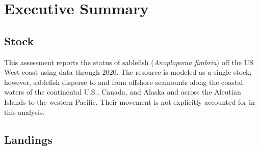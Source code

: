 \documentclass[11pt,
  english,
  a4paper,
]{article}
\begin{document}
\newcommand{\lt}{\ensuremath <}
\newcommand{\gt}{\ensuremath >}

\newlength{\cslhangindent}
\setlength{\cslhangindent}{1.5em}
\newenvironment{cslreferences}%
  {\setlength{\parindent}{0pt}%
  \everypar{\setlength{\hangindent}{\cslhangindent}}\ignorespaces}%
  {\par}

\pagebreak
{}
\setcounter{page}{1}

\renewcommand{\thetable}{\roman{table}}
\renewcommand{\thefigure}{\roman{figure}}


\hypertarget{executive-summary}{%
\section*{Executive Summary}\label{executive-summary}}

\leavevmode\tagmcend\tagstructend


\hypertarget{stock}{%
\subsection*{Stock}\label{stock}}

\leavevmode\tagmcend\tagstructend


This assessment reports the status of sablefish (\emph{Anoplopoma fimbria}) off the US West coast using data through 2020. The resource is modeled as a single stock; however, sablefish disperse to and from offshore seamounts along the coastal waters of the continental U.S., Canada, and Alaska and across the Aleutian Islands to the western Pacific. Their movement is not explicitly accounted for in this analysis.

\leavevmode\tagmcend\tagstructend\par


\hypertarget{landings}{%
\subsection*{Landings}\label{landings}}
\end{document}
